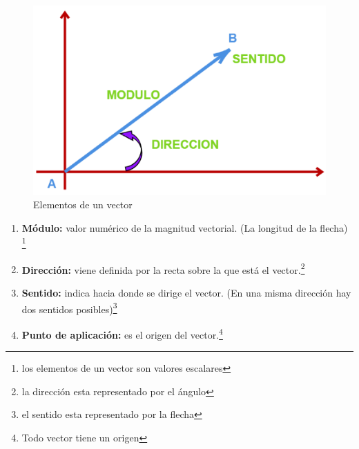 \documentclass[12pt]{article}
\begin{document}
\begin{figure}[h]
    \centering
    \includegraphics[scale=1.75]{13.png}
    \caption{Elementos de un vector}
    \label{fig:elementos de un vector}
\end{figure}


    \begin{enumerate}

    \item \textbf{Módulo:}  valor numérico de la magnitud vectorial. (La longitud de la flecha) \footnote{los elementos de un vector son valores escalares}
\item \textbf{Dirección:} viene definida por la recta sobre la que está el vector.\footnote{la dirección esta representado por el ángulo} 
\item \textbf{Sentido:} indica hacia donde se dirige el vector. (En una misma dirección hay dos sentidos posibles)\footnote{el sentido esta representado por la flecha} 
\item \textbf{Punto de aplicación:} es el origen del vector.\footnote{Todo vector tiene un origen}
\end{enumerate}




   




 
 
\end{document}
